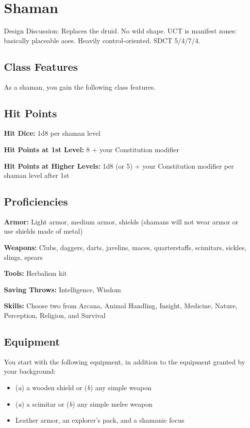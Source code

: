 \section{Shaman\label{class:shaman}}

Design Discussion: Replaces the druid. No wild shape. UCT is manifest zones: basically placeable aoes. Heavily control-oriented. SDCT 5/4/7/4.

\subsection{Class Features}

As a shaman, you gain the following class features.

\subsection{Hit Points}

\textbf{Hit Dice:} 1d8 per shaman level

\textbf{Hit Points at 1st Level:} 8 + your Constitution modifier

\textbf{Hit Points at Higher Levels:} 1d8 (or 5) + your Constitution modifier per shaman level after 1st

\subsection{Proficiencies}

\textbf{Armor:} Light armor, medium armor, shields (shamans will not wear armor or use shields made of metal)

\textbf{Weapons:} Clubs, daggers, darts, javelins, maces, quarterstaffs, scimitars, sickles, slings, spears

\textbf{Tools:} Herbalism kit

\textbf{Saving Throws:} Intelligence, Wisdom

\textbf{Skills:} Choose two from Arcana, Animal Handling, Insight, Medicine, Nature, Perception, Religion, and Survival

\subsection{Equipment}

You start with the following equipment, in addition to the equipment granted by your background:
\begin{itemize}
\item (\textit{a}) a wooden shield or (\textit{b}) any simple weapon
\item (\textit{a}) a scimitar or (\textit{b}) any simple melee weapon
\item Leather armor, an explorer's pack, and a shamanic focus
\end{itemize}

